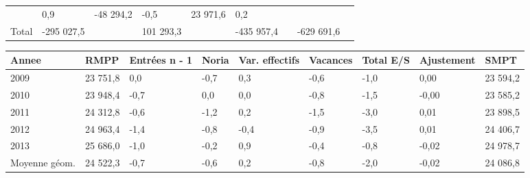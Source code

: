\begin{longtable}[]{@{}lllllllll@{}}
\begin{minipage}[t]{0.16\columnwidth}
\end{minipage} & \begin{minipage}[t]{0.06\columnwidth}\raggedright
0,9\strut
\end{minipage} & \begin{minipage}[t]{0.12\columnwidth}\raggedright
-48 294,2\strut
\end{minipage} & \begin{minipage}[t]{0.06\columnwidth}\raggedright
-0,5\strut
\end{minipage} & \begin{minipage}[t]{0.09\columnwidth}\raggedright
23 971,6\strut
\end{minipage} & \begin{minipage}[t]{0.06\columnwidth}\raggedright
0,2\strut
\end{minipage}\tabularnewline
\begin{minipage}[t]{0.05\columnwidth}\raggedright
Total\strut
\end{minipage} & \begin{minipage}[t]{0.10\columnwidth}\raggedright
-295 027,5\strut
\end{minipage} & \begin{minipage}[t]{0.06\columnwidth}\raggedright
\strut
\end{minipage} & \begin{minipage}[t]{0.16\columnwidth}\raggedright
101 293,3\strut
\end{minipage} & \begin{minipage}[t]{0.06\columnwidth}\raggedright
\strut
\end{minipage} & \begin{minipage}[t]{0.12\columnwidth}\raggedright
-435 957,4\strut
\end{minipage} & \begin{minipage}[t]{0.06\columnwidth}\raggedright
\strut
\end{minipage} & \begin{minipage}[t]{0.09\columnwidth}\raggedright
-629 691,6\strut
\end{minipage} & \begin{minipage}[t]{0.06\columnwidth}\raggedright
\strut
\end{minipage}\tabularnewline
\bottomrule
\end{longtable}

\begin{longtable}[]{@{}lllllllll@{}}
\toprule
Annee & RMPP & Entrées n - 1 & Noria & Var. effectifs & Vacances & Total
E/S & Ajustement & SMPT\tabularnewline
\midrule
\endhead
2009 & 23 751,8 & 0,0 & -0,7 & 0,3 & -0,6 & -1,0 & 0,00 & 23
594,2\tabularnewline
2010 & 23 948,4 & -0,7 & 0,0 & 0,0 & -0,8 & -1,5 & -0,00 & 23
585,2\tabularnewline
2011 & 24 312,8 & -0,6 & -1,2 & 0,2 & -1,5 & -3,0 & 0,01 & 23
898,5\tabularnewline
2012 & 24 963,4 & -1,4 & -0,8 & -0,4 & -0,9 & -3,5 & 0,01 & 24
406,7\tabularnewline
2013 & 25 686,0 & -1,0 & -0,2 & 0,9 & -0,4 & -0,8 & -0,02 & 24
978,7\tabularnewline
Moyenne géom. & 24 522,3 & -0,7 & -0,6 & 0,2 & -0,8 & -2,0 & -0,02 & 24
086,8\tabularnewline
\bottomrule
\end{longtable}

